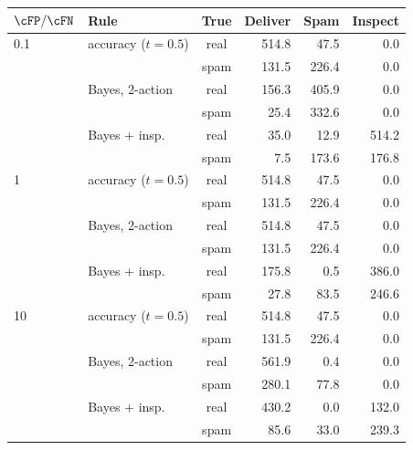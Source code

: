 \begin{tabular}{llcrrr}
\toprule
$\cFP/\cFN$ & Rule & True & Deliver & Spam & Inspect \\
\midrule
0.1 & accuracy ($t=0.5$) & real & 514.8 & 47.5 & 0.0 \\
 &  & spam & 131.5 & 226.4 & 0.0 \\
 & Bayes, 2-action & real & 156.3 & 405.9 & 0.0 \\
 &  & spam & 25.4 & 332.6 & 0.0 \\
 & Bayes + insp. & real & 35.0 & 12.9 & 514.2 \\
 &  & spam & 7.5 & 173.6 & 176.8 \\
\midrule
1 & accuracy ($t=0.5$) & real & 514.8 & 47.5 & 0.0 \\
 &  & spam & 131.5 & 226.4 & 0.0 \\
 & Bayes, 2-action & real & 514.8 & 47.5 & 0.0 \\
 &  & spam & 131.5 & 226.4 & 0.0 \\
 & Bayes + insp. & real & 175.8 & 0.5 & 386.0 \\
 &  & spam & 27.8 & 83.5 & 246.6 \\
\midrule
10 & accuracy ($t=0.5$) & real & 514.8 & 47.5 & 0.0 \\
 &  & spam & 131.5 & 226.4 & 0.0 \\
 & Bayes, 2-action & real & 561.9 & 0.4 & 0.0 \\
 &  & spam & 280.1 & 77.8 & 0.0 \\
 & Bayes + insp. & real & 430.2 & 0.0 & 132.0 \\
 &  & spam & 85.6 & 33.0 & 239.3 \\
\bottomrule
\end{tabular}

